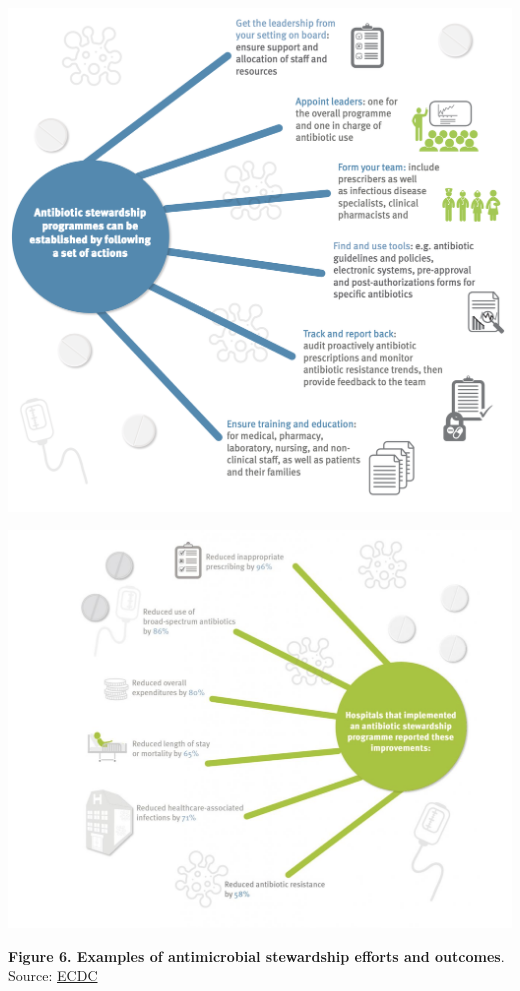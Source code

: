 \documentclass[
  11pt,
  paper=a4,
  ,captions=tableheading
]{scrartcl}
\begin{document}
\includegraphics[width=6.25in,height=\textheight]{images/stewardship actions.png}

\includegraphics[width=6.25in,height=\textheight]{images/stewardship_impl.png}

\textbf{Figure 6. Examples of antimicrobial stewardship efforts and
outcomes}. Source:
\href{https://antibiotic.ecdc.europa.eu/en/infographics-about-antibiotic-stewardship-programmes}{ECDC}
\end{document}
